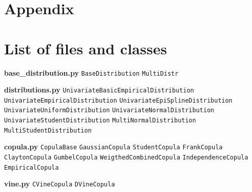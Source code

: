 \documentclass{article}
\begin{document}
	\newpage
	\section*{Appendix}
	\appendix
	\section{List of files and classes}
	\label{sec:list}	 
	 
	 
	 
	 \textbf{base\_distribution.py}\newline
	 \texttt{BaseDistribution} \newline
	 \texttt{MultiDistr}
	
	 
	 \textbf{distributions.py}
	 \newline
	 \texttt{UnivariateBasicEmpiricalDistribution} \newline
	 \texttt{UnivariateEmpiricalDistribution} \newline
	 \texttt{UnivariateEpiSplineDistribution} \newline
	 \texttt{UnivariateUniformDistribution} \newline
	 \texttt{UnivariateNormalDistribution} \newline
	 \texttt{UnivariateStudentDistribution} \newline
	 \texttt{MultiNormalDistribution} \newline
	 \texttt{MultiStudentDistribution} \newline
	 
	
	 \textbf{copula.py}
	 \newline
	 \texttt{CopulaBase} \newline
	 \texttt{GaussianCopula} \newline
	 \texttt{StudentCopula} \newline
	 \texttt{FrankCopula} \newline
	 \texttt{ClaytonCopula} \newline
	 \texttt{GumbelCopula} \newline
	 \texttt{WeigthedCombinedCopula} \newline
	 \texttt{IndependenceCopula} \newline
	 \texttt{EmpiricalCopula} \newline
	 
	 \textbf{vine.py}
	\newline
	 \texttt{CVineCopula} \newline
	 \texttt{DVineCopula}\newline
	 
\end{document}
